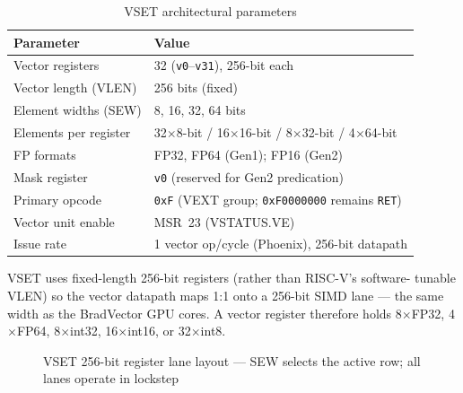 \documentclass[11pt,a4paper]{article}
\begin{document}
\begin{table}[H]
\centering
\caption{VSET architectural parameters}
\begin{tabular}{ll}
\toprule
Parameter & Value \\
\midrule
Vector registers & 32 ({\tt v0}--{\tt v31}), 256-bit each \\
Vector length (VLEN) & 256 bits (fixed) \\
Element widths (SEW) & 8, 16, 32, 64 bits \\
Elements per register & 32$\times$8-bit / 16$\times$16-bit / 8$\times$32-bit / 4$\times$64-bit \\
FP formats & FP32, FP64 (Gen1); FP16 (Gen2) \\
Mask register & {\tt v0} (reserved for Gen2 predication) \\
Primary opcode & {\tt 0xF} (VEXT group; {\tt 0xF0000000} remains {\tt RET}) \\
Vector unit enable & MSR~23 (VSTATUS.VE) \\
Issue rate & 1 vector op/cycle (Phoenix), 256-bit datapath \\
\bottomrule
\end{tabular}
\end{table}

VSET uses fixed-length 256-bit registers (rather than RISC-V's software-
tunable VLEN) so the vector datapath maps 1:1 onto a 256-bit SIMD lane ---
the same width as the BradVector GPU cores. A vector register therefore holds
8$\times$FP32, 4$\times$FP64, 8$\times$int32, 16$\times$int16, or
32$\times$int8.

\begin{figure}[H]
\centering
{}
\caption{VSET 256-bit register lane layout --- SEW selects the active row; all lanes operate in lockstep}
\end{figure}
\end{document}
